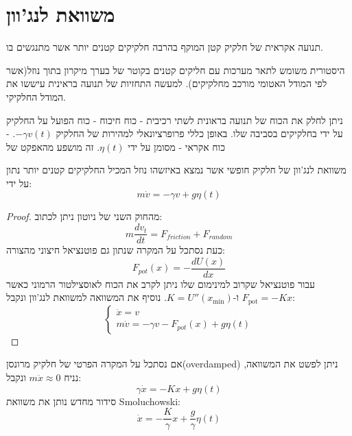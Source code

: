 \documentclass{tstextbook}
\begin{document}
\section{משוואת לנג'וון}

\begin{definition}
תנועה אקראית של חלקיק קטן המוקף בהרבה חלקיקים קטנים יותר אשר מתנגשים בו.

\end{definition}
\begin{remark}
היסטורית משומש לתאר מערכות עם חליקים קטנים בקוטר של בערך מיקרון בתוך נוזל(אשר לפי המודל האטומי מורכב מחלקיקים). למעשה התחזיות של תנועה בראינית עיששו את המודל החלקיקי.

\end{remark}
\begin{proposition}
ניתן לחלק את הכוח של תנועה בראונית לשתי רכיבית
- כוח חיכוח - כוח הפועל על החלקיק על ידי בחלקיקים בסביבה שלו. באופן כללי פרופרציונאלי למהירות של החלקיק \(-\gamma v(t)\).
- כוח אקראי - מסומן על ידי \(\eta(t)\).  זה מושפע מהאפקט של 

\end{proposition}
\begin{proposition}
משוואת לנג'וון של חלקיק חופשי אשר נמצא באיזשהו נוזל המכיל החלקיקים קטנים יותר  נתון על ידי:
$$ m\dot{v} = -\gamma v + g\eta(t) $$

\end{proposition}
\begin{proof}
מהחוק השני של ניוטון ניתן לכתוב:
$$ m\frac{dv_t}{dt} = F_{friction} + F_{random} $$
כעת נסתכל על המקרה שנתון גם פוטנציאל חיצוני מהצורה:
$$ F_{pot}(x) = -\frac{dU(x)}{dx} $$
עבור פוטנציאל שקרוב למינימום שלו ניתן לקרב את הכוח לאוסצילטור הרמוני כאשר \(F_{\text{pot}}=-Kx\) ו-\(K=U''\left( x_{\text{min}} \right)\). נוסיף את המשוואה למשוואת לנג'וון ונקבל:
$$ \begin{cases} \dot{x} = v \\ m\dot{v} = -\gamma v - F_{pot}(x) + g\eta(t) \end{cases} $$

\end{proof}
אם נסתכל על המקרה הפרטי של חלקיק מרונסן(overdamped) ניתן לפשט את המשוואה, נניח \(m\ddot{x} \approx 0\) ונקבל:
$$ \gamma\dot{x} = -Kx + g\eta(t) $$
סידור מחדש נותן את משוואת Smoluchowski:
$$ \dot{x} = -\frac{K}{\gamma}x + \frac{g}{\gamma}\eta(t) $$
\end{document}

